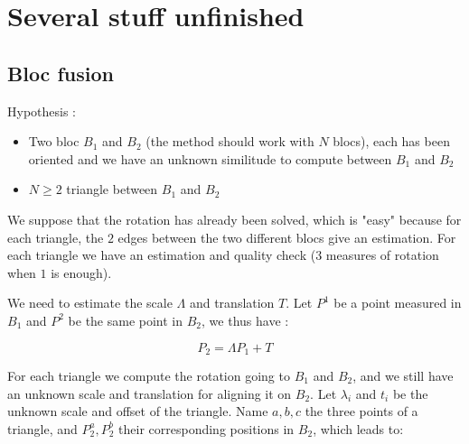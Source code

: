 

\chapter{Several stuff unfinished}





\section{Bloc fusion}

Hypothesis :

\begin{itemize}
    \item Two bloc $B_1$ and $B_2$  (the method should work with $N$ blocs),
          each has been oriented and we have an unknown similitude to compute between $B_1$ and $B_2$

    \item $N\geq 2$ triangle between $B_1$ and $B_2$
\end{itemize}

We suppose that the rotation has already been solved, which is "easy" because for each triangle,
the $2$ edges between the two different blocs give an estimation.  For each triangle we have an estimation
and quality check ($3$ measures of rotation when $1$ is enough). 

We need to estimate the scale $\Lambda$ and translation $T$. 
Let $P^1$  be a point measured in $B_1$ and $P^2$ be the same point in $B_2$, 
we thus have :

\begin{equation}
	P_2 = \Lambda P_1 + T \label{Eq:Bloc12}
\end{equation}

For each triangle we compute the rotation going to $B_1$ and $B_2$, and we still
have an unknown scale and translation for aligning it on $B_2$.
Let $\lambda_i$ and $t_i$  be the unknown scale and offset of the triangle.
Name $a,b,c$ the three points of a triangle, and $P^a_2, P^b_2 $ their corresponding positions
in $B_2$, which leads to:

